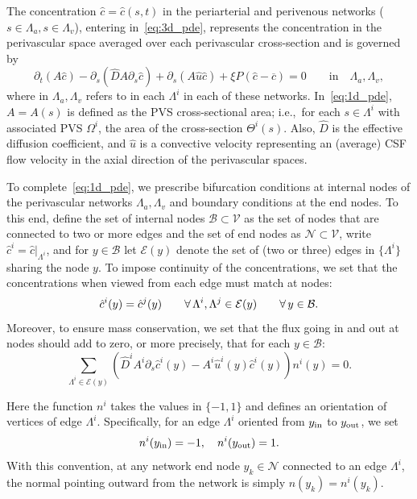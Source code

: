 \documentclass[fleqn,10pt]{wlscirep}
\begin{document}
The concentration $\hat{c} = \hat{c}(s, t)$ in the periarterial and
perivenous networks ($s \in \Lambda_a, s \in \Lambda_v$), entering
in~\eqref{eq:3d_pde}, represents the concentration in the perivascular
space averaged over each perivascular cross-section and is governed by 
\begin{equation}
  \partial_t (A  \hat c) - \partial_s( \hat D A \partial_s \hat c  ) + \partial_s(A \hat u \hat c )  +  \xi P (\hat c - \overline{c}) = 0
  \qquad \text{in} \quad \Lambda_a, \Lambda_v ,
\label{eq:1d_pde}
\end{equation}
where in $\Lambda_a, \Lambda_v$ refers to in each $\Lambda^i$ in each
of these networks. In~\eqref{eq:1d_pde}, $A = A(s)$ is defined as the
PVS cross-sectional area; i.e.,~for each $s \in \Lambda^i$ with
associated PVS $\Omega^i$, the area of the cross-section
$\Theta^i(s)$. Also, $\hat{D}$ is the effective diffusion coefficient,
and $\hat{u}$ is a convective velocity representing an (average) CSF
flow velocity in the axial direction of the perivascular spaces.

To complete~\eqref{eq:1d_pde}, we prescribe bifurcation conditions at
internal nodes of the perivascular networks $\Lambda_a, \Lambda_v$ and
boundary conditions at the end nodes. To this end, define the set of
internal nodes $\mathcal{B} \subset \mathcal{V}$ as the set of nodes
that are connected to two or more edges and the set of end nodes as
$\mathcal{N} \subset \mathcal{V}$, write $\hat{c}^i =
\hat{c}|_{\Lambda^i}$, and for $y\in\mathcal{B}$ let $\mathcal{E}(y)$ denote the set of
(two or three) edges in $\{\Lambda^i\}$ sharing the node $y$. To
impose continuity of the concentrations, we set that the
concentrations when viewed from each edge must match at nodes:
\begin{equation}
  \hat{c}^i (y) = \hat{c}^j(y)
  \qquad \forall \, \Lambda^i, \Lambda^j \in \mathcal{E}(y)
  \qquad \forall \, y \in \mathcal{B} .
  \label{eq:conc_continuity}
\end{equation}
Moreover, to ensure mass conservation, we set that the flux
going in and out at nodes should add to zero, or more precisely, that
for each $y \in \mathcal{B}$:
\begin{equation}
  \sum_{\Lambda^i \in \mathcal{E}(y)}
  \left (\hat{D}^i A^i \partial_s \hat{c}^i (y) - A^i \hat u^i(y) \hat{c}^i(y) \right ) n^i(y)
  = 0.
  \label{eq:flux_conservation}
\end{equation}

Here the function $n^i$ takes the values in $\{-1, 1\}$ and defines an orientation of vertices of edge $\Lambda^i$. Specifically, for an edge $\Lambda^i$ oriented from $y_{\rm in}$ to $y_{\rm out}$, we set
\begin{equation}
  n^i(y_{\rm in}) = -1, \quad n^i(y_{\rm out}) = 1.
\end{equation}
With this convention, at any network end node $y_k \in \mathcal{N}$ connected to an edge $\Lambda^i$, the normal pointing outward from the network is simply $n(y_k) = n^i(y_k)$.
\end{document}
